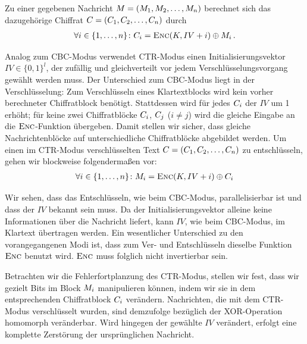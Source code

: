 Zu einer gegebenen Nachricht $M = (M_{1},M_{2},\dots,M_{n})$ berechnet sich das dazugehörige Chiffrat $C = (C_{1},C_{2}, \dots,C_{n})$ durch
\begin{align*}
	\forall i \in \{1,\dots,n\}\colon C_i = \textsc{Enc}(K, IV + i) \oplus M_i\, .
\end{align*}

Analog zum CBC-Modus verwendet CTR-Modus einen Initialisierungsvektor $IV \in \{0,1\}^{l}$, der zufällig und gleichverteilt vor jedem Verschlüsselungsvorgang gewählt werden muss. Der Unterschied zum CBC-Modus liegt in der Verschlüsselung: Zum Verschlüsseln eines Klartextblocks wird kein vorher berechneter Chiffratblock benötigt. Stattdessen wird für jedes $C_i$ der $IV$ um 1 erhöht; für keine zwei Chiffratblöcke $C_i$, $C_j$ ($i \neq j$) wird die gleiche Eingabe an die $\textsc{Enc}$-Funktion übergeben. Damit stellen wir sicher, dass gleiche Nachrichtenblöcke auf unterschiedliche Chiffratblöcke abgebildet werden. Um einen im CTR-Modus verschlüsselten Text $C = (C_{1},C_{2},\dots,C_{n})$ zu entschlüsseln, gehen wir blockweise folgendermaßen vor:
\begin{align*}
	\forall i \in \{1,\dots,n\}\colon M_i = \textsc{Enc}(K, IV + i) \oplus C_i
\end{align*}

Wir sehen, dass das Entschlüsseln, wie beim CBC-Modus, parallelisierbar ist und dass der $IV$ bekannt sein muss. Da der Initialisierungsvektor alleine keine Informationen über die Nachricht liefert, kann $IV$, wie beim CBC-Modus, im Klartext übertragen werden. Ein wesentlicher Unterschied zu den vorangegangenen Modi ist, dass zum Ver- und Entschlüsseln dieselbe Funktion $\textsc{Enc}$ benutzt wird. $\textsc{Enc}$ muss folglich nicht invertierbar sein.

Betrachten wir die Fehlerfortplanzung des CTR-Modus, stellen wir fest, dass wir gezielt Bits im Block $M_i$ manipulieren können, indem wir sie in dem entsprechenden Chiffratblock $C_i$ verändern. Nachrichten, die mit dem CTR-Modus verschlüsselt wurden, sind demzufolge bezüglich der XOR-Operation homomorph veränderbar. Wird hingegen der gewählte $IV$ verändert, erfolgt eine komplette Zerstörung der ursprünglichen Nachricht. 

